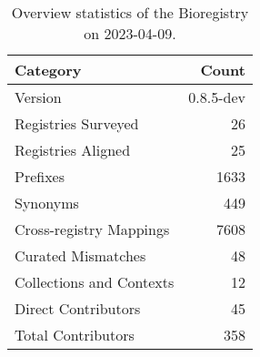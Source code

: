 \begin{table}
\caption{Overview statistics of the Bioregistry on 2023-04-09.}
\label{tab:bioregistry-summary}
\begin{tabular}{lr}
\toprule
Category & Count \\
\midrule
Version & 0.8.5-dev \\
Registries Surveyed & 26 \\
Registries Aligned & 25 \\
Prefixes & 1633 \\
Synonyms & 449 \\
Cross-registry Mappings & 7608 \\
Curated Mismatches & 48 \\
Collections and Contexts & 12 \\
Direct Contributors & 45 \\
Total Contributors & 358 \\
\bottomrule
\end{tabular}
\end{table}
